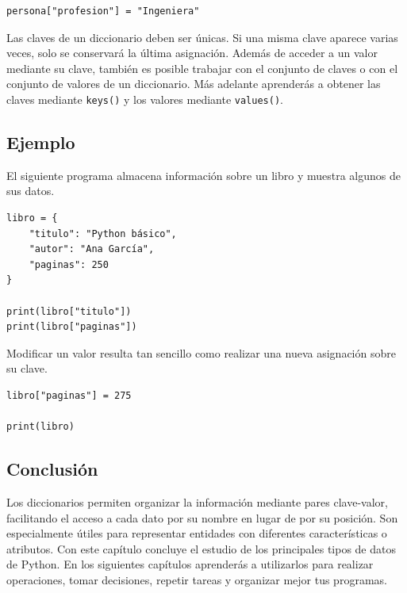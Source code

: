 \documentclass[11pt,a5paper,twoside]{book}
\begin{document}
\begin{tcolorbox}
\scriptsize
 \begin{verbatim}
persona["profesion"] = "Ingeniera"
\end{verbatim}
\end{tcolorbox}
Las claves de un diccionario deben ser únicas. Si una misma clave aparece varias veces, solo se conservará la última asignación.
Además de acceder a un valor mediante su clave, también es posible trabajar con el conjunto de claves o con el conjunto de valores de un diccionario. Más adelante aprenderás a obtener las claves mediante {\scriptsize \texttt{keys()}} y los valores mediante {\scriptsize \texttt{values()}}.
\subsection{Ejemplo}
El siguiente programa almacena información sobre un libro y muestra algunos de sus datos.


\begin{tcolorbox}
\scriptsize
 \begin{verbatim}
libro = {
    "titulo": "Python básico",
    "autor": "Ana García",
    "paginas": 250
}

print(libro["titulo"])
print(libro["paginas"])
\end{verbatim}
\end{tcolorbox}
Modificar un valor resulta tan sencillo como realizar una nueva asignación sobre su clave.


\begin{tcolorbox}
\scriptsize
 \begin{verbatim}
libro["paginas"] = 275

print(libro)
\end{verbatim}
\end{tcolorbox}
\subsection{Conclusión}
Los diccionarios permiten organizar la información mediante pares clave-valor, facilitando el acceso a cada dato por su nombre en lugar de por su posición. Son especialmente útiles para representar entidades con diferentes características o atributos.
Con este capítulo concluye el estudio de los principales tipos de datos de Python. En los siguientes capítulos aprenderás a utilizarlos para realizar operaciones, tomar decisiones, repetir tareas y organizar mejor tus programas.

\newpage
\end{document}
